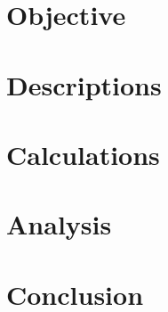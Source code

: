 \documentclass{article}
\begin{document}
\begin{titlepage}

\end{titlepage}
\section{Objective}

\section{Descriptions}

\section{Calculations}

\section{Analysis}

\section{Conclusion}

\end{document}
